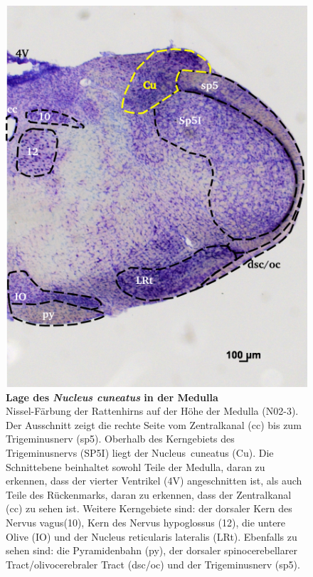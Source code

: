\documentclass[12pt,a4paper,pdftex]{article}
\begin{document}
\begin{figure}[H]
    \centering
    \includegraphics{pictures/somatosensory/nucleus_cuneatus.png}
    \caption[Lage des \textit{Nucleus cuneatus} in der Medulla]{\textbf{Lage des \textit{Nucleus cuneatus} in der Medulla}\\
    Nissel-Färbung der Rattenhirns auf der Höhe der Medulla (N02-3). Der Ausschnitt zeigt die rechte Seite vom Zentralkanal (cc) bis zum Trigeminusnerv (sp5). Oberhalb des Kerngebiets des Trigeminusnervs (SP5I) liegt der Nucleus~cuneatus (Cu). Die Schnittebene beinhaltet sowohl Teile der Medulla, daran zu erkennen, dass der vierter Ventrikel (4V) angeschnitten ist, als auch Teile des Rückenmarks, daran zu erkennen, dass der Zentralkanal (cc) zu sehen ist. Weitere Kerngebiete sind: der dorsaler Kern des Nervus vagus(10), Kern des Nervus hypoglossus (12), die untere Olive (IO) und der Nucleus reticularis lateralis (LRt). Ebenfalls zu sehen sind: die Pyramidenbahn (py), der dorsaler spinocerebellarer Tract/olivocerebraler Tract (dsc/oc) und der Trigeminusnerv (sp5).}
    \label{fig:nucleus_cuneatus}
\end{figure}
\end{document}
